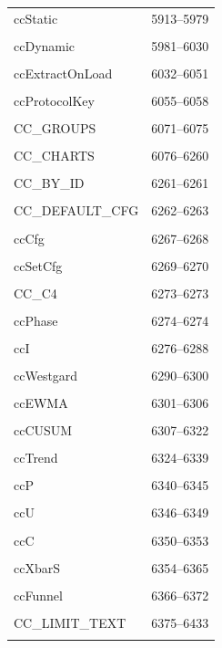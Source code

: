 {\begin{longtable}{@{}p{11cm}r@{}}
ccStatic & 5913--5979 \\\\\hline
ccDynamic & 5981--6030 \\\\\hline
ccExtractOnLoad & 6032--6051 \\\\\hline
ccProtocolKey & 6055--6058 \\\\\hline
CC\_GROUPS & 6071--6075 \\\\\hline
CC\_CHARTS & 6076--6260 \\\\\hline
CC\_BY\_ID & 6261--6261 \\\\\hline
CC\_DEFAULT\_CFG & 6262--6263 \\\\\hline
ccCfg & 6267--6268 \\\\\hline
ccSetCfg & 6269--6270 \\\\\hline
CC\_C4 & 6273--6273 \\\\\hline
ccPhase & 6274--6274 \\\\\hline
ccI & 6276--6288 \\\\\hline
ccWestgard & 6290--6300 \\\\\hline
ccEWMA & 6301--6306 \\\\\hline
ccCUSUM & 6307--6322 \\\\\hline
ccTrend & 6324--6339 \\\\\hline
ccP & 6340--6345 \\\\\hline
ccU & 6346--6349 \\\\\hline
ccC & 6350--6353 \\\\\hline
ccXbarS & 6354--6365 \\\\\hline
ccFunnel & 6366--6372 \\\\\hline
CC\_LIMIT\_TEXT & 6375--6433 \\\\\hline

\end{longtable}}
